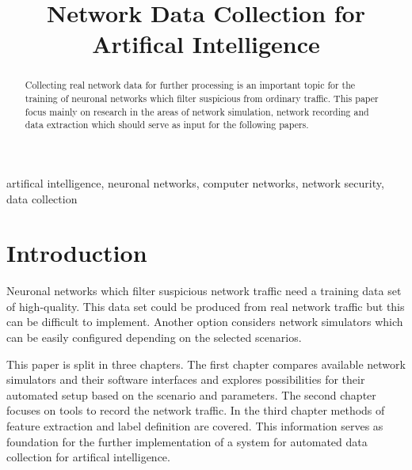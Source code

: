 \documentclass[conference]{IEEEtran}
\begin{document}
\title{Network Data Collection for Artifical Intelligence
}

\author{
\and
{}
\and
{}
}

\maketitle

\begin{abstract}
Collecting real network data for further processing is an important topic for the training of neuronal networks which filter suspicious from ordinary traffic. This paper focus mainly on research in the areas of network simulation, network recording and data extraction which should serve as input for the following papers.
\end{abstract}

\begin{IEEEkeywords}
artifical intelligence, neuronal networks, computer networks, network security, data collection
\end{IEEEkeywords}

\section{Introduction}
Neuronal networks which filter suspicious network traffic need a training data set of high-quality. This data set could be produced from real network traffic but this can be difficult to implement. Another option considers network simulators which can be easily configured depending on the selected scenarios.

This paper is split in three chapters. The first chapter compares available network simulators and their software interfaces and explores possibilities for their automated setup based on the scenario and parameters. The second chapter focuses on tools to record the network traffic. In the third chapter methods of feature extraction and label definition are covered. This information serves as foundation for the further implementation of a system for automated data collection for artifical intelligence.
\end{document}
